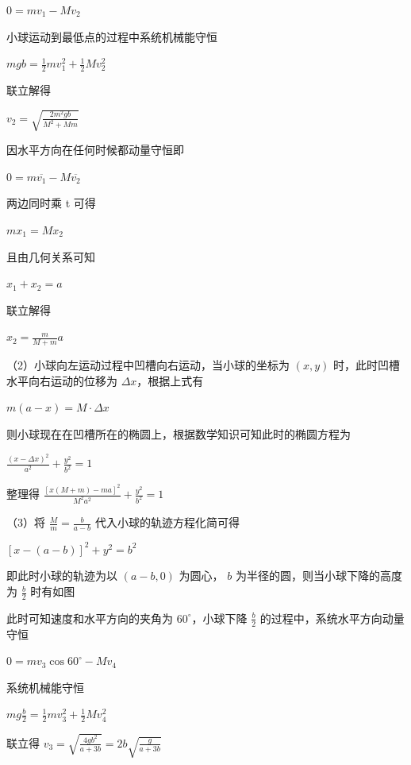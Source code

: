 \documentclass[\gkver]{gaokaozhenti}
\begin{document}
\begin{enumerate}
{ $0 = mv_{1} - Mv_{2}$

小球运动到最低点的过程中系统机械能守恒

 $mgb = \frac{1}{2}mv_{1}^{2} + \frac{1}{2}Mv_{2}^{2}$

联立解得

 $v_{2} = \sqrt{\frac{2m^{2}gb}{M^{2} + Mm}}$

因水平方向在任何时候都动量守恒即

 $0 = m\overline{v_{1}} - M\overline{v_{2}}$

两边同时乘 t 可得

 $mx_{1} = Mx_{2}$

且由几何关系可知

 $x_{1} + x_{2} = a$

联立解得

 $x_{2} = \frac{m}{M + m} a$

（2）小球向左运动过程中凹槽向右运动，当小球的坐标为  $(x,y)$ 时，此时凹槽水平向右运动的位移为  $\Delta x$，根据上式有

$m(a-x)=M\cdot\Delta x$

则小球现在在凹槽所在的椭圆上，根据数学知识可知此时的椭圆方程为

 $\frac{(x-\Delta x)^2}{a^2}+\frac{y^2}{b^2}=1$

整理得  $\frac{[x(M+m)-ma]^2}{M^2a^2} + \frac{y^2}{b^2} = 1$

（3）将  $\frac{M}{m} = \frac{b}{a - b}$ 代入小球的轨迹方程化简可得

 $\left[x - (a - b)\right]^2 + y^2 = b^2$

即此时小球的轨迹为以  $(a - b,0)$ 为圆心， $b$ 为半径的圆，则当小球下降的高度为  $\frac{b}{2}$ 时有如图


此时可知速度和水平方向的夹角为  $60^\circ$，小球下降  $\frac{b}{2}$ 的过程中，系统水平方向动量守恒

 $0 = mv_3 \cos 60^\circ - Mv_4$

系统机械能守恒

 $mg\frac{b}{2} = \frac{1}{2}mv_3^2 + \frac{1}{2}Mv_4^2$

联立得  $v_3 = \sqrt{\frac{4gb^2}{a + 3b}} = 2b\sqrt{\frac{g}{a + 3b}}$
}

\end{enumerate}
\end{document}
